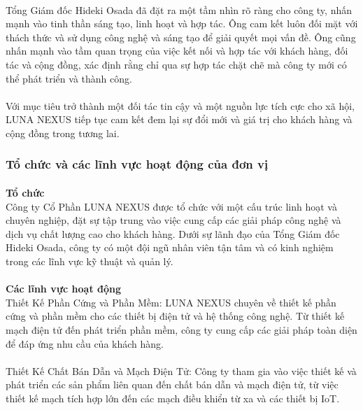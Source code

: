 \begin{flushleft}
		\paragraph{}
		\fontsize{14}{20}\selectfont Tổng Giám đốc Hideki Osada đã đặt ra một tầm nhìn rõ ràng cho công ty, nhấn mạnh vào tinh thần sáng tạo, linh hoạt và hợp tác. Ông cam kết luôn đối mặt với thách thức và sử dụng công nghệ và sáng tạo để giải quyết mọi vấn đề. Ông cũng nhấn mạnh vào tầm quan trọng của việc kết nối và hợp tác với khách hàng, đối tác và cộng đồng, xác định rằng chỉ qua sự hợp tác chặt chẽ mà công ty mới có thể phát triển và thành công.
		\paragraph{}
		\fontsize{14}{20}\selectfont Với mục tiêu trở thành một đối tác tin cậy và một nguồn lực tích cực cho xã hội, LUNA NEXUS tiếp tục cam kết đem lại sự đổi mới và giá trị cho khách hàng và cộng đồng trong tương lai.
		\subsubsection{Tổ chức và các lĩnh vực hoạt động của đơn vị}
		\paragraph{}
		\textbf{Tổ chức}\\
		\fontsize{14}{20}\selectfont Công ty Cổ Phần LUNA NEXUS được tổ chức với một cấu trúc linh hoạt và chuyên nghiệp, đặt sự tập trung vào việc cung cấp các giải pháp công nghệ và dịch vụ chất lượng cao cho khách hàng. Dưới sự lãnh đạo của Tổng Giám đốc Hideki Osada, công ty có một đội ngũ nhân viên tận tâm và có kinh nghiệm trong các lĩnh vực kỹ thuật và quản lý. \\
		\paragraph{}
		\textbf{Các lĩnh vực hoạt động}\\
		\fontsize{14}{20}\selectfont Thiết Kế Phần Cứng và Phần Mềm: LUNA NEXUS chuyên về thiết kế phần cứng và phần mềm cho các thiết bị điện tử và hệ thống công nghệ. Từ thiết kế mạch điện tử đến phát triển phần mềm, công ty cung cấp các giải pháp toàn diện để đáp ứng nhu cầu của khách hàng.\\
		\paragraph{}
		\fontsize{14}{20}\selectfont Thiết Kế Chất Bán Dẫn và Mạch Điện Tử: Công ty tham gia vào việc thiết kế và phát triển các sản phẩm liên quan đến chất bán dẫn và mạch điện tử, từ việc thiết kế mạch tích hợp lớn đến các mạch điều khiển từ xa và các thiết bị IoT.\\

\end{flushleft}
